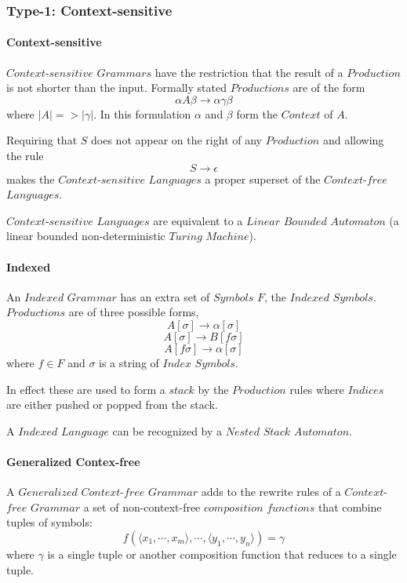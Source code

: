 \documentclass{article}
\begin{document}
\subsubsection{Type-1: Context-sensitive}

\paragraph{Context-sensitive}
$Context$-$sensitive$ $Grammars$ have the restriction that the result
of a $Production$ is not shorter than the input. Formally stated
$Productions$ are of the form
\[
    \alpha A \beta \rightarrow \alpha \gamma \beta
\]
where $|A| => |\gamma|$. In this formulation $\alpha$ and $\beta$ form
the $Context$ of $A$.

Requiring that $S$ does not appear on the right of any $Production$
and allowing the rule
\[
    S \rightarrow \epsilon
\]
makes the $Context$-$sensitive$ $Languages$ a proper superset of the
$Context$-$free$ $Languages$.

$Context$-$sensitive$ $Languages$ are equivalent to a $Linear$
$Bounded$ $Automaton$ (a linear bounded non-deterministic $Turing$
$Machine$).

\paragraph{Indexed}

An $Indexed$ $Grammar$ has an extra set of $Symbols$ $F$, the
$Indexed$ $Symbols$. $Productions$ are of three possible forms,
\[
    A[\sigma] \rightarrow \alpha[\sigma]
\]\[
    A[\sigma] \rightarrow B[f\sigma]
\]\[
    A[f\sigma] \rightarrow \alpha[\sigma]
\]
where $f \in F$ and $\sigma$ is a string of $Index$ $Symbols$.

In effect these are used to form a $stack$ by the $Production$ rules
where $Indices$ are either pushed or popped from the stack.

A $Indexed$ $Language$ can be recognized by a $Nested$ $Stack$
$Automaton$.

\paragraph{Generalized Contex-free}
A $Generalized$ $Context$-$free$ $Grammar$ adds to the rewrite rules
of a $Context$-$free$ $Grammar$ a set of non-context-free
$composition$ $functions$ that combine tuples of symbols:
\[
    f(\langle x_1,\cdots,x_m\rangle,\cdots,\langle
    y_1,\cdots,y_n\rangle)=\gamma
\]
where $\gamma$ is a single tuple or another composition function that
reduces to a single tuple.
\end{document}

